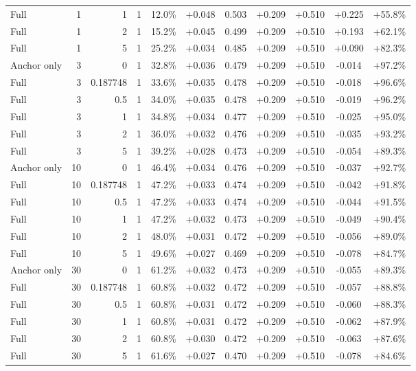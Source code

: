 \begin{table}[htbp]
\begin{tabular}{lrrrccccccc}
Full & 1 & 1 & 1 & 12.0\% & +0.048 & 0.503 & +0.209 & +0.510 & +0.225 & +55.8\% \\
Full & 1 & 2 & 1 & 15.2\% & +0.045 & 0.499 & +0.209 & +0.510 & +0.193 & +62.1\% \\
Full & 1 & 5 & 1 & 25.2\% & +0.034 & 0.485 & +0.209 & +0.510 & +0.090 & +82.3\% \\
Anchor only & 3 & 0 & 1 & 32.8\% & +0.036 & 0.479 & +0.209 & +0.510 & -0.014 & +97.2\% \\
Full & 3 & 0.187748 & 1 & 33.6\% & +0.035 & 0.478 & +0.209 & +0.510 & -0.018 & +96.6\% \\
Full & 3 & 0.5 & 1 & 34.0\% & +0.035 & 0.478 & +0.209 & +0.510 & -0.019 & +96.2\% \\
Full & 3 & 1 & 1 & 34.8\% & +0.034 & 0.477 & +0.209 & +0.510 & -0.025 & +95.0\% \\
Full & 3 & 2 & 1 & 36.0\% & +0.032 & 0.476 & +0.209 & +0.510 & -0.035 & +93.2\% \\
Full & 3 & 5 & 1 & 39.2\% & +0.028 & 0.473 & +0.209 & +0.510 & -0.054 & +89.3\% \\
Anchor only & 10 & 0 & 1 & 46.4\% & +0.034 & 0.476 & +0.209 & +0.510 & -0.037 & +92.7\% \\
Full & 10 & 0.187748 & 1 & 47.2\% & +0.033 & 0.474 & +0.209 & +0.510 & -0.042 & +91.8\% \\
Full & 10 & 0.5 & 1 & 47.2\% & +0.033 & 0.474 & +0.209 & +0.510 & -0.044 & +91.5\% \\
Full & 10 & 1 & 1 & 47.2\% & +0.032 & 0.473 & +0.209 & +0.510 & -0.049 & +90.4\% \\
Full & 10 & 2 & 1 & 48.0\% & +0.031 & 0.472 & +0.209 & +0.510 & -0.056 & +89.0\% \\
Full & 10 & 5 & 1 & 49.6\% & +0.027 & 0.469 & +0.209 & +0.510 & -0.078 & +84.7\% \\
Anchor only & 30 & 0 & 1 & 61.2\% & +0.032 & 0.473 & +0.209 & +0.510 & -0.055 & +89.3\% \\
Full & 30 & 0.187748 & 1 & 60.8\% & +0.032 & 0.472 & +0.209 & +0.510 & -0.057 & +88.8\% \\
Full & 30 & 0.5 & 1 & 60.8\% & +0.031 & 0.472 & +0.209 & +0.510 & -0.060 & +88.3\% \\
Full & 30 & 1 & 1 & 60.8\% & +0.031 & 0.472 & +0.209 & +0.510 & -0.062 & +87.9\% \\
Full & 30 & 2 & 1 & 60.8\% & +0.030 & 0.472 & +0.209 & +0.510 & -0.063 & +87.6\% \\
Full & 30 & 5 & 1 & 61.6\% & +0.027 & 0.470 & +0.209 & +0.510 & -0.078 & +84.6\% \\

\end{tabular}
\end{table}
